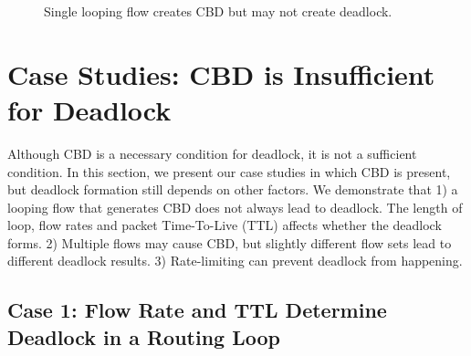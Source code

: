 \begin{figure}[t]
\centering
{}
\vspace{-0.15in}
\caption{Single looping flow creates CBD but may not create deadlock.}
\vspace{-0.15in}
\label{fig:loop}
\end{figure}

\secspacelarge
\section{Case Studies: CBD is Insufficient for Deadlock}
\label{sec:analysis}
\secspace

Although CBD is a necessary condition for deadlock, it is not a
sufficient condition. In this section, we present our case studies in which CBD
is present, but deadlock formation still depends on other factors. We demonstrate
that 1) a looping flow that generates CBD does not always lead to deadlock.
The length of loop, flow rates and packet Time-To-Live (TTL) affects whether
the deadlock forms. 2) Multiple flows may cause CBD,
but slightly different flow sets lead to different deadlock results. 3) Rate-limiting can
prevent deadlock from happening.

\secspace
\subsection{Case 1: Flow Rate and TTL Determine Deadlock in a Routing Loop}
\secspace

